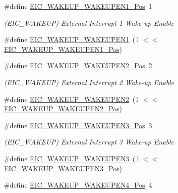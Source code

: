 \begin{DoxyCompactItemize}
\item 
\#define \mbox{\hyperlink{group___s_a_m_d21___e_i_c_gaeb982e09b2eb4cc28badf87b3b353bd4}{E\+I\+C\+\_\+\+W\+A\+K\+E\+U\+P\+\_\+\+W\+A\+K\+E\+U\+P\+E\+N1\+\_\+\+Pos}}~1
\begin{DoxyCompactList}\small\item\em (E\+I\+C\+\_\+\+W\+A\+K\+E\+UP) External Interrupt 1 Wake-\/up Enable \end{DoxyCompactList}\item 
\#define \mbox{\hyperlink{group___s_a_m_d21___e_i_c_gaa73e7cc09934ecc9e0b57c71134060a2}{E\+I\+C\+\_\+\+W\+A\+K\+E\+U\+P\+\_\+\+W\+A\+K\+E\+U\+P\+E\+N1}}~(1 $<$$<$ \mbox{\hyperlink{group___s_a_m_d21___e_i_c_gaeb982e09b2eb4cc28badf87b3b353bd4}{E\+I\+C\+\_\+\+W\+A\+K\+E\+U\+P\+\_\+\+W\+A\+K\+E\+U\+P\+E\+N1\+\_\+\+Pos}})
\item 
\#define \mbox{\hyperlink{group___s_a_m_d21___e_i_c_ga9868da564c302649d8fd8a7137a7130b}{E\+I\+C\+\_\+\+W\+A\+K\+E\+U\+P\+\_\+\+W\+A\+K\+E\+U\+P\+E\+N2\+\_\+\+Pos}}~2
\begin{DoxyCompactList}\small\item\em (E\+I\+C\+\_\+\+W\+A\+K\+E\+UP) External Interrupt 2 Wake-\/up Enable \end{DoxyCompactList}\item 
\#define \mbox{\hyperlink{group___s_a_m_d21___e_i_c_ga1211685698deb1e80b769bddc99df82c}{E\+I\+C\+\_\+\+W\+A\+K\+E\+U\+P\+\_\+\+W\+A\+K\+E\+U\+P\+E\+N2}}~(1 $<$$<$ \mbox{\hyperlink{group___s_a_m_d21___e_i_c_ga9868da564c302649d8fd8a7137a7130b}{E\+I\+C\+\_\+\+W\+A\+K\+E\+U\+P\+\_\+\+W\+A\+K\+E\+U\+P\+E\+N2\+\_\+\+Pos}})
\item 
\#define \mbox{\hyperlink{group___s_a_m_d21___e_i_c_ga58062cfb09a37725bfebf13ae6ed6efc}{E\+I\+C\+\_\+\+W\+A\+K\+E\+U\+P\+\_\+\+W\+A\+K\+E\+U\+P\+E\+N3\+\_\+\+Pos}}~3
\begin{DoxyCompactList}\small\item\em (E\+I\+C\+\_\+\+W\+A\+K\+E\+UP) External Interrupt 3 Wake-\/up Enable \end{DoxyCompactList}\item 
\#define \mbox{\hyperlink{group___s_a_m_d21___e_i_c_ga1f72497b10a9094d7911bf1336cae12d}{E\+I\+C\+\_\+\+W\+A\+K\+E\+U\+P\+\_\+\+W\+A\+K\+E\+U\+P\+E\+N3}}~(1 $<$$<$ \mbox{\hyperlink{group___s_a_m_d21___e_i_c_ga58062cfb09a37725bfebf13ae6ed6efc}{E\+I\+C\+\_\+\+W\+A\+K\+E\+U\+P\+\_\+\+W\+A\+K\+E\+U\+P\+E\+N3\+\_\+\+Pos}})
\item 
\#define \mbox{\hyperlink{group___s_a_m_d21___e_i_c_ga8ccdcbc56f526b9c95fe6be73a453300}{E\+I\+C\+\_\+\+W\+A\+K\+E\+U\+P\+\_\+\+W\+A\+K\+E\+U\+P\+E\+N4\+\_\+\+Pos}}~4
$$
\end{DoxyCompactItemize}
